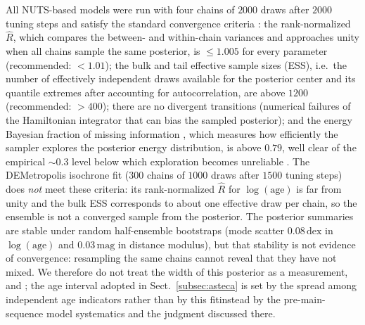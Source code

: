 \documentclass{aa}
\providecommand{\DIFaddtex}[1]{{\protect\color[rgb]{0,0,0.7}#1}} %
\providecommand{\DIFdeltex}[1]{{\protect\color[rgb]{0.65,0,0}\footnotesize #1}} %
\providecommand{\DIFaddbegin}{} %
\providecommand{\DIFaddend}{} %
\providecommand{\DIFdelbegin}{} %
\providecommand{\DIFdelend}{} %
\providecommand{\DIFadd}[1]{\texorpdfstring{\DIFaddtex{#1}}{#1}} %
\providecommand{\DIFdel}[1]{\texorpdfstring{\DIFdeltex{#1}}{}} %
\providecommand{\DIFscaledelfig}{0.5}
\newlength{\DIFdelgraphicswidth} %
\newlength{\DIFdelgraphicsheight} %
\providecommand{\DIFaddincludegraphics}[2][]{{\color{blue}\fbox{\DIFOincludegraphics[#1]{#2}}}} %
\providecommand{\DIFdelincludegraphics}[2][]{%
\sbox{\DIFdelgraphicsbox}{\DIFOincludegraphics[#1]{#2}}%
\settoboxwidth{\DIFdelgraphicswidth}{\DIFdelgraphicsbox} %
\settoboxtotalheight{\DIFdelgraphicsheight}{\DIFdelgraphicsbox} %
\scalebox{\DIFscaledelfig}{%
\parbox[b]{\DIFdelgraphicswidth}{\usebox{\DIFdelgraphicsbox}\\[-\baselineskip] \rule{\DIFdelgraphicswidth}{0em}}\llap{\resizebox{\DIFdelgraphicswidth}{\DIFdelgraphicsheight}{%
\setlength{\unitlength}{\DIFdelgraphicswidth}%
\begin{picture}(1,1)%
\thicklines\linethickness{2pt} %
{\color[rgb]{1,0,0}\put(0,0){\framebox(1,1){}}}%
{\color[rgb]{1,0,0}\put(0,0){\line( 1,1){1}}}%
{\color[rgb]{1,0,0}\put(0,1){\line(1,-1){1}}}%
\end{picture}%
}\hspace*{3pt}}} %
} %
\DeclareRobustCommand{\DIFaddbegin}{\DIFOaddbegin \let\includegraphics\DIFaddincludegraphics} %
\DeclareRobustCommand{\DIFaddend}{\DIFOaddend \let\includegraphics\DIFOincludegraphics} %
\DeclareRobustCommand{\DIFdelbegin}{\DIFOdelbegin \let\includegraphics\DIFdelincludegraphics} %
\DeclareRobustCommand{\DIFdelend}{\DIFOaddend \let\includegraphics\DIFOincludegraphics} %
\begin{document}
All NUTS-based models were run with four chains of $2000$ draws after $2000$ tuning steps and satisfy the standard convergence criteria \citep{2021BayAn..16..667V}: the rank-normalized $\hat{R}$, which compares the between- and within-chain variances and approaches unity when all chains sample the same posterior, is $\leq1.005$ for every parameter (recommended: $<1.01$); the bulk and tail effective sample sizes (ESS), i.e.\ the number of effectively independent draws available for the posterior center and its quantile extremes after accounting for autocorrelation, are above $1200$ (recommended: $>400$); there are no divergent transitions (numerical failures of the Hamiltonian integrator that can bias the sampled posterior); and the energy Bayesian fraction of missing information \citep[E-BFMI;][]{2016arXiv160400695B}, which measures how efficiently the sampler explores the posterior energy distribution, is above $0.79$, well clear of the empirical ${\sim}0.3$ level below which exploration becomes unreliable \citep{2017arXiv170102434B}. The DEMetropolis isochrone fit ($300$ chains of $1000$ draws after $1500$ tuning steps) does \emph{not} meet these criteria: its rank-normalized $\hat{R}$ for $\log(\mathrm{age})$ is far from unity and the bulk ESS corresponds to about one effective draw per chain, so the ensemble is not a converged sample from the posterior. The posterior summaries are stable under random half-ensemble bootstraps (mode scatter $0.08\,\mathrm{dex}$ in $\log(\mathrm{age})$ and $0.03\,\mathrm{mag}$ in distance modulus), but that stability is not evidence of convergence: resampling the same chains cannot reveal that they have not mixed. We therefore do not treat the width of this posterior as a measurement\DIFdelbegin \DIFdel{, and }\DIFdelend \DIFaddbegin \DIFadd{; }\DIFaddend the age interval adopted in Sect.~\ref{subsec:asteca} is set \DIFdelbegin \DIFdel{by the spread among independent age indicators rather than by this fit}\DIFdelend \DIFaddbegin \DIFadd{instead by the pre-main-sequence model systematics and the judgment discussed there}\DIFaddend .
\end{document}
